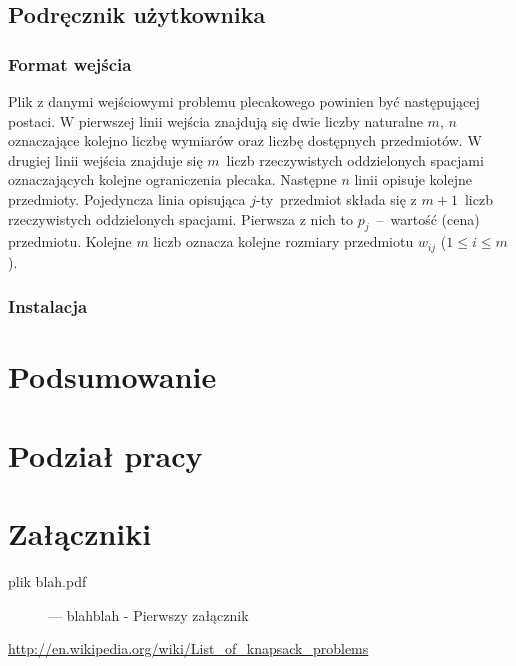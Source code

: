 \documentclass[a4paper,12pt,notitlepage]{mwrep}
\begin{document}
\section{Podręcznik użytkownika}
\subsection{Format wejścia}
Plik z danymi wejściowymi problemu plecakowego powinien być następującej postaci. W pierwszej
linii wejścia znajdują się dwie liczby naturalne $m$, $n$ oznaczające kolejno liczbę wymiarów
oraz liczbę dostępnych przedmiotów. W drugiej linii wejścia znajduje się $m$~liczb rzeczywistych oddzielonych
spacjami oznaczających kolejne ograniczenia plecaka. Następne $n$ linii opisuje kolejne przedmioty.
Pojedyncza linia opisująca $j$-ty~przedmiot składa się z $m+1$~liczb rzeczywistych oddzielonych spacjami.
Pierwsza z nich to $p_j$~--~wartość (cena)
przedmiotu. Kolejne $m$ liczb oznacza kolejne rozmiary przedmiotu $w_{ij}$  ($1 \le i \le m$).

\subsection{Instalacja}

\chapter{Podsumowanie}

\chapter{Podział pracy}

\addtocounter{page}{-1}

\appendix
\chapter*{Załączniki}
\begin{description}
	\item[plik blah.pdf]	 --- blahblah - Pierwszy załącznik
\end{description}

\begin{thebibliography}{9}

	\href{http://en.wikipedia.org/wiki/List_of_knapsack_problems}{http://en.wikipedia.org/wiki/List\_of\_knapsack\_problems}

\end{thebibliography}


\listoffigures

\listoftables

\label{LastPage}
\end{document}

